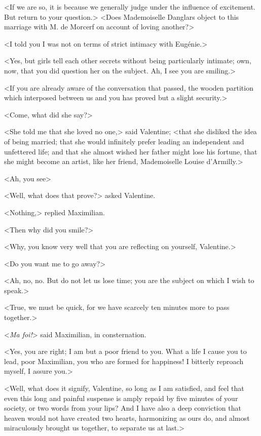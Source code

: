  <If we are so, it is because we generally judge under the influence of excitement. But return to your question.>  <Does Mademoiselle Danglars object to this marriage with M. de Morcerf on account of loving another?> 

 <I told you I was not on terms of strict intimacy with Eugénie.> 

 <Yes, but girls tell each other secrets without being particularly intimate; own, now, that you did question her on the subject. Ah, I see you are smiling.> 

 <If you are already aware of the conversation that passed, the wooden partition which interposed between us and you has proved but a slight security.> 

 <Come, what did she say?> 

 <She told me that she loved no one,> said Valentine; <that she disliked the idea of being married; that she would infinitely prefer leading an independent and unfettered life; and that she almost wished her father might lose his fortune, that she might become an artist, like her friend, Mademoiselle Louise d'Armilly.> 

 <Ah, you see\longdash> 

 <Well, what does that prove?> asked Valentine. 

 <Nothing,> replied Maximilian. 

 <Then why did you smile?> 

 <Why, you know very well that you are reflecting on yourself, Valentine.> 

 <Do you want me to go away?> 

 <Ah, no, no. But do not let us lose time; you are the subject on which I wish to speak.> 

 <True, we must be quick, for we have scarcely ten minutes more to pass together.> 

 <\textit{Ma foi!}> said Maximilian, in consternation. 

 <Yes, you are right; I am but a poor friend to you. What a life I cause you to lead, poor Maximilian, you who are formed for happiness! I bitterly reproach myself, I assure you.> 

 <Well, what does it signify, Valentine, so long as I am satisfied, and feel that even this long and painful suspense is amply repaid by five minutes of your society, or two words from your lips? And I have also a deep conviction that heaven would not have created two hearts, harmonizing as ours do, and almost miraculously brought us together, to separate us at last.> 

